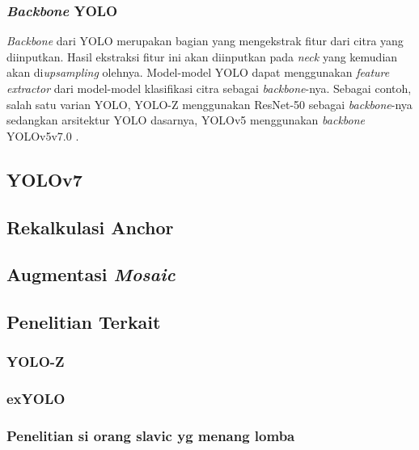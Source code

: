  \subsubsection{\emph{Backbone} YOLO}
    \emph{Backbone} dari YOLO merupakan bagian yang mengekstrak fitur dari citra yang diinputkan.
    Hasil ekstraksi fitur ini akan diinputkan pada \emph{neck} yang kemudian akan di\emph{upsampling} olehnya.
    Model-model YOLO dapat menggunakan \emph{feature extractor} dari model-model klasifikasi citra sebagai \emph{backbone}-nya.
    Sebagai contoh, salah satu varian YOLO, YOLO-Z menggunakan ResNet-50 sebagai \emph{backbone}-nya sedangkan arsitektur YOLO dasarnya, YOLOv5 menggunakan \emph{backbone} YOLOv5v7.0 \parencite{yoloz}.




\subsection{YOLOv7}
  \lipsum[1]
\subsection{Rekalkulasi Anchor}
  \lipsum[1]
\subsection{Augmentasi \emph{Mosaic}}
  \lipsum[1]

\subsection{Penelitian Terkait}
  \subsubsection{YOLO-Z}
    \lipsum[2]
  \subsubsection{exYOLO}
    \lipsum[2]
  \subsubsection{Penelitian si orang slavic yg menang lomba}
    \lipsum[2]
